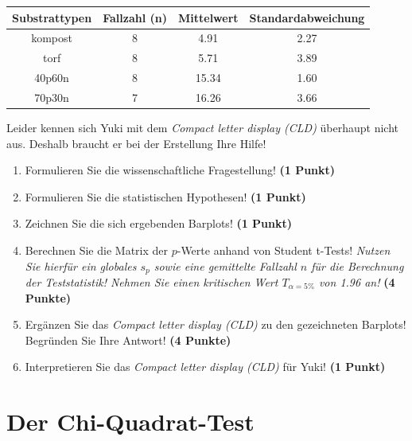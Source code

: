 \documentclass[a4paper, 9pt]{scrartcl}\usepackage[]{graphicx}\usepackage[]{xcolor}
\newenvironment{knitrout}{}{} %
\begin{document}
\begin{knitrout}
\color{fgcolor}\begin{table}[!h]
\centering\begingroup\fontsize{10}{12}\selectfont

\begin{tabular}{cccc}
\toprule
\textbf{Substrattypen} & \textbf{Fallzahl (n)} & \textbf{Mittelwert} & \textbf{Standardabweichung}\\
\midrule
kompost & 8 & 4.91 & 2.27\\
torf & 8 & 5.71 & 3.89\\
40p60n & 8 & 15.34 & 1.60\\
70p30n & 7 & 16.26 & 3.66\\
\bottomrule
\end{tabular}
\endgroup{}
\end{table}

\end{knitrout}

Leider kennen sich Yuki mit dem \textit{Compact letter display (CLD)} überhaupt nicht aus. Deshalb braucht er bei der Erstellung Ihre Hilfe!

\begin{enumerate}
  \item Formulieren Sie die wissenschaftliche Fragestellung! \textbf{(1 Punkt)}
  \item Formulieren Sie die statistischen Hypothesen! \textbf{(1 Punkt)}
\item Zeichnen Sie die sich ergebenden Barplots! \textbf{(1 Punkt)}
\item Berechnen Sie die Matrix der $p$-Werte anhand von Student t-Tests! \textit{Nutzen Sie hierfür ein globales $s_p$ sowie eine gemittelte Fallzahl $n$ für die Berechnung der Teststatistik! Nehmen Sie einen kritischen Wert $T_{\alpha = 5\%}$ von 1.96 an!} \textbf{(4 Punkte)}
\item Ergänzen Sie das \textit{Compact letter display (CLD)} zu den gezeichneten Barplots! Begründen Sie Ihre Antwort! \textbf{(4 Punkte)}
\item Interpretieren Sie das \textit{Compact letter display (CLD)} für Yuki! \textbf{(1 Punkt)} 
\end{enumerate}

 
\clearpage
\part{Der Chi-Quadrat-Test}
\end{document}

